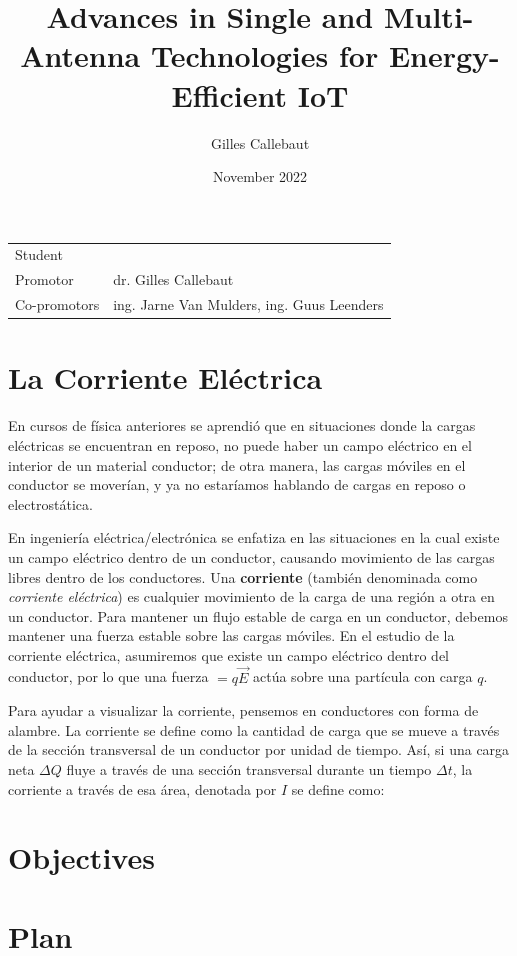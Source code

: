 \documentclass{article}
\title{Advances in Single and Multi-Antenna Technologies for Energy-Efficient IoT
}
\author{Gilles Callebaut}
\date{November 2022}
\begin{document}
	
	\maketitle
	
	\noindent\begin{tabular}{@{}ll}
		Student & \theauthor\\
		Promotor &  dr. Gilles Callebaut\\
		Co-promotors & ing. Jarne Van Mulders, ing. Guus Leenders
	\end{tabular}
	
	\section*{La Corriente Eléctrica}
	En cursos de física anteriores se aprendió que en situaciones donde la cargas eléctricas se encuentran en reposo, no puede haber un campo eléctrico  en el interior de un material conductor; de otra manera, las cargas móviles en el conductor se moverían, y ya no estaríamos hablando de cargas en reposo o electrostática.
	
	En ingeniería eléctrica/electrónica se enfatiza en las situaciones en la cual existe un campo eléctrico dentro de un conductor, causando movimiento de las cargas libres dentro de los conductores. Una \textbf{corriente} (también denominada como \textit{corriente eléctrica}) es cualquier movimiento de la carga de una región a otra en un conductor. Para mantener un flujo estable de carga en un conductor, debemos mantener una fuerza estable sobre las cargas móviles. En el estudio de la corriente eléctrica, asumiremos que existe un campo eléctrico  dentro del conductor, por lo que una fuerza  $=q\vec{E}$ actúa sobre una partícula con carga $q$.
	
	Para ayudar a visualizar la corriente, pensemos en conductores con forma de alambre. La corriente se define como la cantidad de carga que se mueve a través de la sección transversal de un conductor por unidad de tiempo. Así, si una carga neta $\Delta Q$ fluye a través de una sección transversal durante un tiempo $\Delta t$, la corriente a través de esa área, denotada por $I$ se define como:
	
	
	\section*{Objectives}
	\lipsum[3-3]
	
	\section*{Plan}
	\lipsum[4-4]
	
	
	
\end{document}

